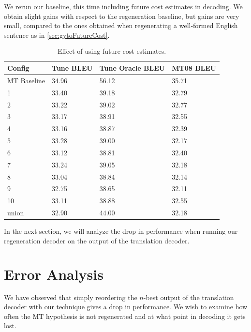 We rerun our baseline, this time including future cost estimates
in decoding. We obtain slight gains with respect to the regeneration
baseline, but gains are very small, compared to the ones obtained
when regenerating a well-formed English sentence as in \autoref{sec:gytoFutureCost}.
%
\begin{table}
  \begin{center}
    \begin{tabular}{l|l|l|l}
      Config & Tune BLEU & Tune Oracle BLEU & MT08 BLEU \\
      \hline
      MT Baseline & 34.96 & 56.12 & 35.71 \\
      \hline
      1 & 33.40 & 39.18 & 32.79 \\
      2 & 33.22 & 39.02 & 32.77 \\
      3 & 33.17 & 38.91 & 32.55 \\
      4 & 33.16 & 38.87 & 32.39 \\
      5 & 33.28 & 39.00 & 32.17 \\
      6 & 33.12 & 38.81 & 32.40 \\
      7 & 33.24 & 39.05 & 32.18 \\
      8 & 33.04 & 38.84 & 32.14 \\
      9 & 32.75 & 38.65 & 32.11 \\
      10 & 33.11 & 38.88 & 32.55 \\
      union & 32.90 & 44.00 & 32.18 \\
    \end{tabular}
  \end{center}
  \caption{Effect of using future cost estimates.}
\end{table}
%
In the next section, we will analyze the drop in performance
when running our regeneration decoder on the output
of the translation decoder.

\section{Error Analysis}
\label{sec:gyroTransErrorAnalysis}


We have observed that simply reordering the $n$-best output
of the translation decoder with our technique gives a drop
in performance. We wish to examine how often the MT
hypothesis is not regenerated and at what point in decoding
it gets lost.

